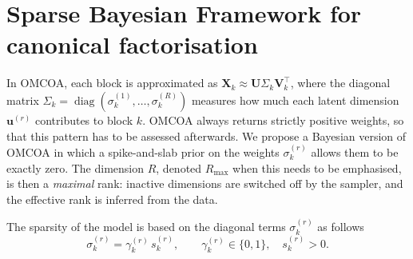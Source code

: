 \documentclass[11pt]{article}
\DeclareMathOperator{\diag}{diag}
\newcommand{\X}{\mathbf{X}}
\newcommand{\U}{\mathbf{U}}
\newcommand{\V}{\mathbf{V}}
\newcommand{\uu}{\mathbf{u}}
\begin{document}
\section{Sparse Bayesian Framework for canonical factorisation}
In OMCOA, each block is approximated as $\X_k\approx\U\Sigma_k\V_k^\intercal$, where the diagonal matrix
$\Sigma_k=\diag(\sigma_k^{(1)},\ldots,\sigma_k^{(R)})$ measures how much each latent dimension $\uu^{(r)}$ contributes to block $k$. 
OMCOA always returns strictly positive weights, so that this pattern has to be assessed afterwards. We propose a Bayesian version of OMCOA in which a spike-and-slab prior on the weights $\sigma_k^{(r)}$ allows them to be exactly zero. The dimension $R$, denoted $R_{\max}$ when this needs to be emphasised, is then a \emph{maximal} rank: inactive dimensions are switched off by the sampler, and the effective rank is inferred from the data.

The sparsity of the model is based on the diagonal terms $\sigma_k^{(r)}$ as follows
\begin{equation}
  \sigma_k^{(r)}=\gamma_k^{(r)}\,s_k^{(r)},\qquad \gamma_k^{(r)}\in\{0,1\},\quad s_k^{(r)}>0 .
  \label{eq:spike}
\end{equation}
\end{document}
